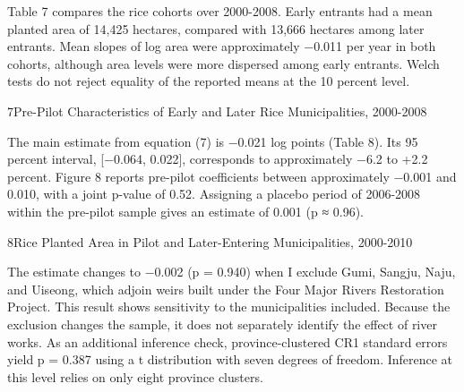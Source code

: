 
Table 7 compares the rice cohorts over 2000-2008. Early entrants had a mean planted area of 14,425 hectares, compared with 13,666 hectares among later entrants. Mean slopes of log area were approximately −0.011 per year in both cohorts, although area levels were more dispersed among early entrants. Welch tests do not reject equality of the reported means at the 10 percent level.

\begin{wordtable}{7}{Pre-Pilot Characteristics of Early and Later Rice Municipalities, 2000-2008}

\end{wordtable}

The main estimate from equation (7) is −0.021 log points (Table 8). Its 95 percent interval, [−0.064, 0.022], corresponds to approximately −6.2 to +2.2 percent. Figure 8 reports pre-pilot coefficients between approximately −0.001 and 0.010, with a joint p-value of 0.52. Assigning a placebo period of 2006-2008 within the pre-pilot sample gives an estimate of 0.001 (p ≈ 0.96).

\begin{wordtable}{8}{Rice Planted Area in Pilot and Later-Entering Municipalities, 2000-2010}

\end{wordtable}

The estimate changes to −0.002 (p = 0.940) when I exclude Gumi, Sangju, Naju, and Uiseong, which adjoin weirs built under the Four Major Rivers Restoration Project. This result shows sensitivity to the municipalities included. Because the exclusion changes the sample, it does not separately identify the effect of river works. As an additional inference check, province-clustered CR1 standard errors yield p = 0.387 using a t distribution with seven degrees of freedom. Inference at this level relies on only eight province clusters.

